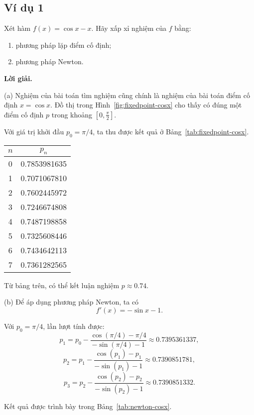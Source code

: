 \subsection*{\textbf{Ví dụ 1}}

Xét hàm $f(x) = \cos x - x$. Hãy xấp xỉ nghiệm của $f$ bằng:
\begin{enumerate}[label=(\alph*)]
  \item phương pháp lặp điểm cố định;
  \item phương pháp Newton.
\end{enumerate}

\textbf{Lời giải.}

(a) Nghiệm của bài toán tìm nghiệm cũng chính là nghiệm của bài toán điểm cố định $x = \cos x$. 
Đồ thị trong Hình~\ref{fig:fixedpoint-cosx} cho thấy có đúng một điểm cố định $p$ trong khoảng $[0,\tfrac{\pi}{2}]$. 

Với giá trị khởi đầu $p_0 = \pi/4$, ta thu được kết quả ở Bảng~\ref{tab:fixedpoint-cosx}.

\begin{center}
\label{tab:fixedpoint-cosx}
\begin{tabular}{|c|c|}
\hline
$n$ & $p_n$ \\
\hline
0 & 0.7853981635 \\
1 & 0.7071067810 \\
2 & 0.7602445972 \\
3 & 0.7246674808 \\
4 & 0.7487198858 \\
5 & 0.7325608446 \\
6 & 0.7434642113 \\
7 & 0.7361282565 \\
\hline
\end{tabular}
\end{center}

Từ bảng trên, có thể kết luận nghiệm $p \approx 0.74$.

(b) Để áp dụng phương pháp Newton, ta có
\[
f'(x) = -\sin x - 1.
\]

Với $p_0 = \pi/4$, lần lượt tính được:
\[
p_1 = p_0 - \frac{\cos(\pi/4) - \pi/4}{-\sin(\pi/4) - 1} \approx 0.7395361337,
\]
\[
p_2 = p_1 - \frac{\cos(p_1) - p_1}{-\sin(p_1) - 1} \approx 0.7390851781,
\]
\[
p_3 = p_2 - \frac{\cos(p_2) - p_2}{-\sin(p_2) - 1} \approx 0.7390851332.
\]

Kết quả được trình bày trong Bảng~\ref{tab:newton-cosx}.

